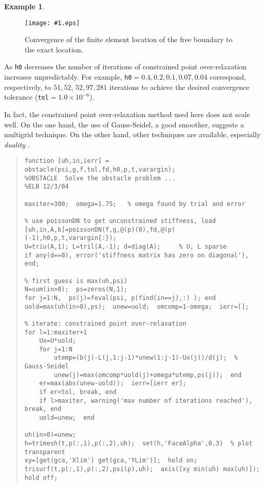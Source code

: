 \documentclass[12pt,final]{amsart}
\newcommand{\regfigure}[2]{\texttt{[image: \#1.eps]}}
\newcommand{\mtt}{\texttt}
\theoremstyle{definition}
\newtheorem{example}{Example}
\begin{document}
\begin{example}
\begin{figure}[ht]
\regfigure{freebdryconv}{2.5}
\caption{Convergence of the finite element location of the free boundary to the exact location.} \label{fig:freebdryconv}
\end{figure}

As \mtt{h0} decreases the number of iterations of constrained point over-relaxation increases unpredictably.  For example, \mtt{h0}$=0.4, 0.2, 0.1, 0.07, 0.04$ correspond, respectively, to $51,52$, $52,97,281$ iterations to achieve the desired convergence tolerance (\mtt{tol}$=1.0\times 10^{-6}$).

In fact, the constrained point over-relaxation method used here does not scale well.  On the one hand, the use of Gauss-Seidel, a good smoother, suggests a multigrid technique.  On the other hand, other techniques are available, especially \emph{duality} \cite{CDDSV,GLT}.
\end{example}

\small\begin{quote}\begin{verbatim}
function [uh,in,ierr] = obstacle(psi,g,f,tol,fd,h0,p,t,varargin);
%OBSTACLE  Solve the obstacle problem ...
%ELB 12/3/04

maxiter=300;  omega=1.75;   % omega found by trial and error

% use poissonDN to get unconstrained stiffness, load
[uh,in,A,b]=poissonDN(f,g,@(p)(0),fd,@(p)(-1),h0,p,t,varargin{:});
U=triu(A,1); L=tril(A,-1); d=diag(A);     % U, L sparse
if any(d==0), error('stiffness matrix has zero on diagonal'), end;

% first guess is max(uh,psi)
N=sum(in>0);  ps=zeros(N,1);
for j=1:N,  ps(j)=feval(psi, p(find(in==j),:) ); end
uold=max(uh(in>0),ps);  unew=uold;  omcomp=1-omega;  ierr=[];

% iterate: constrained point over-relaxation
for l=1:maxiter+1
    Ux=U*uold;
    for j=1:N
        utemp=(b(j)-L(j,1:j-1)*unew(1:j-1)-Ux(j))/d(j);  % Gauss-Seidel
        unew(j)=max(omcomp*uold(j)+omega*utemp,ps(j));  end
    er=max(abs(unew-uold));  ierr=[ierr er];
    if er<tol, break, end
    if l>maxiter, warning('max number of iterations reached'), break, end
    uold=unew;  end

uh(in>0)=unew;
h=trimesh(t,p(:,1),p(:,2),uh);  set(h,'FaceAlpha',0.3)  % plot transparent
xy=[get(gca,'Xlim') get(gca,'YLim')];  hold on;
trisurf(t,p(:,1),p(:,2),psi(p),uh);  axis([xy min(uh) max(uh)]);  hold off;
\end{verbatim}
\end{quote}
\normalsize\phantom{BOB}




\end{document}
